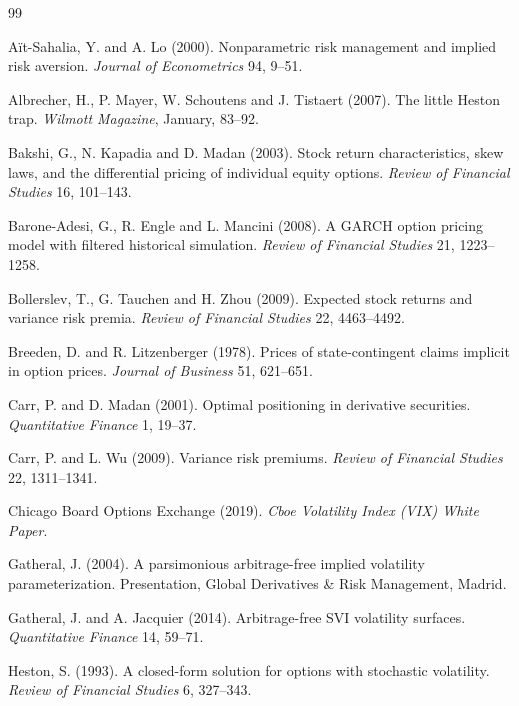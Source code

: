 \documentclass[11pt,a4paper]{article}
\theoremstyle{remark}
\begin{document}
\begin{thebibliography}{99}
\small

Aït-Sahalia, Y. and A. Lo (2000). Nonparametric risk management and implied
risk aversion. \emph{Journal of Econometrics} 94, 9--51.

Albrecher, H., P. Mayer, W. Schoutens and J. Tistaert (2007). The little Heston
trap. \emph{Wilmott Magazine}, January, 83--92.

Bakshi, G., N. Kapadia and D. Madan (2003). Stock return characteristics, skew
laws, and the differential pricing of individual equity options.
\emph{Review of Financial Studies} 16, 101--143.

Barone-Adesi, G., R. Engle and L. Mancini (2008). A GARCH option pricing model
with filtered historical simulation. \emph{Review of Financial Studies} 21,
1223--1258.

Bollerslev, T., G. Tauchen and H. Zhou (2009). Expected stock returns and
variance risk premia. \emph{Review of Financial Studies} 22, 4463--4492.

Breeden, D. and R. Litzenberger (1978). Prices of state-contingent claims
implicit in option prices. \emph{Journal of Business} 51, 621--651.

Carr, P. and D. Madan (2001). Optimal positioning in derivative securities.
\emph{Quantitative Finance} 1, 19--37.

Carr, P. and L. Wu (2009). Variance risk premiums. \emph{Review of Financial
Studies} 22, 1311--1341.

Chicago Board Options Exchange (2019). \emph{Cboe Volatility Index (VIX) White
Paper}.

Gatheral, J. (2004). A parsimonious arbitrage-free implied volatility
parameterization. Presentation, Global Derivatives \& Risk Management, Madrid.

Gatheral, J. and A. Jacquier (2014). Arbitrage-free SVI volatility surfaces.
\emph{Quantitative Finance} 14, 59--71.

Heston, S. (1993). A closed-form solution for options with stochastic
volatility. \emph{Review of Financial Studies} 6, 327--343.


\end{thebibliography}
\end{document}
